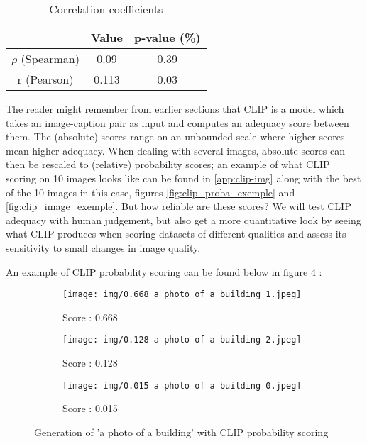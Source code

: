 \documentclass{article}
\begin{document}
\begin{multicols}{2}
\begin{table*}[]
    \centering
    \begin{tabular}{ |c|c|c| } 
    \hline
    & Value & p-value (\%) \\ 
    \hline
    $\rho$  (Spearman) & 0.09 & 0.39 \\ 
    r (Pearson) & 0.113 & 0.03 \\ 
    \hline
    \end{tabular}
    \caption{Correlation coefficients}
    \label{tab:cor-coeffs}
\end{table*}


The reader might remember from earlier sections that CLIP is a model which takes an image-caption pair as input and computes an adequacy score between them. The (absolute) scores range on an unbounded scale where higher scores mean higher adequacy. When dealing with several images, absolute scores can then be rescaled to (relative) probability scores; an example of what CLIP scoring on 10 images looks like can be found in \ref{app:clip-img} along with the best of the 10 images in this case, figures \ref{fig:clip_proba_exemple} and \ref{fig:clip_image_exemple}. But how reliable are these scores? We will test CLIP adequacy with human judgement, but also get a more quantitative look by seeing what CLIP produces when scoring datasets of different qualities and assess its sensitivity to small changes in image quality.

An example of CLIP probability scoring can be found below in figure \ref{fig:clip_scoring} :

\begin{figure}[H]
\begin{subfigure}{.3\textwidth}
  \centering
  \texttt{[image: img/0.668 a photo of a building 1.jpeg]}
  \caption{Score : 0.668}
  \label{fig:red_hist}
\end{subfigure}%
\begin{subfigure}{.3\textwidth}
  \centering
  \texttt{[image: img/0.128 a photo of a building 2.jpeg]}
  \caption{Score : 0.128}
  \label{fig:green_hist}
\end{subfigure}
\begin{subfigure}{.3\textwidth}
  \centering
  \texttt{[image: img/0.015 a photo of a building 0.jpeg]}
  \caption{Score : 0.015}
  \label{fig:blue_hist}
\end{subfigure}

\caption{Generation of 'a photo of a building' with CLIP probability scoring}
\label{fig:clip_scoring}
\end{figure}


\end{multicols}
\end{document}
